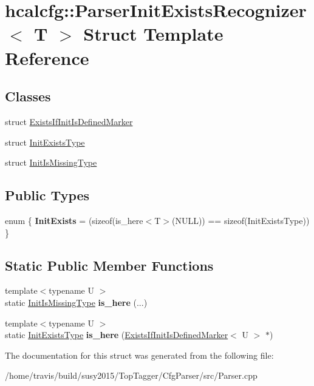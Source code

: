\hypertarget{structhcalcfg_1_1ParserInitExistsRecognizer}{\section{hcalcfg\-:\-:Parser\-Init\-Exists\-Recognizer$<$ T $>$ Struct Template Reference}
\label{structhcalcfg_1_1ParserInitExistsRecognizer}
}
\subsection*{Classes}
\begin{DoxyCompactItemize}
\item 
struct \hyperlink{structhcalcfg_1_1ParserInitExistsRecognizer_1_1ExistsIfInitIsDefinedMarker}{Exists\-If\-Init\-Is\-Defined\-Marker}
\item 
struct \hyperlink{structhcalcfg_1_1ParserInitExistsRecognizer_1_1InitExistsType}{Init\-Exists\-Type}
\item 
struct \hyperlink{structhcalcfg_1_1ParserInitExistsRecognizer_1_1InitIsMissingType}{Init\-Is\-Missing\-Type}
\end{DoxyCompactItemize}
\subsection*{Public Types}
\begin{DoxyCompactItemize}
\item 
enum \{ {\bfseries Init\-Exists} = (sizeof(is\-\_\-here$<$T$>$(N\-U\-L\-L)) == sizeof(Init\-Exists\-Type))
 \}
\end{DoxyCompactItemize}
\subsection*{Static Public Member Functions}
\begin{DoxyCompactItemize}
\item 
\hypertarget{structhcalcfg_1_1ParserInitExistsRecognizer_aadde7f9eaac716099eb3c14007f85c6b}{{\footnotesize template$<$typename U $>$ }\\static \hyperlink{structhcalcfg_1_1ParserInitExistsRecognizer_1_1InitIsMissingType}{Init\-Is\-Missing\-Type} {\bfseries is\-\_\-here} (...)}\label{structhcalcfg_1_1ParserInitExistsRecognizer_aadde7f9eaac716099eb3c14007f85c6b}

\item 
\hypertarget{structhcalcfg_1_1ParserInitExistsRecognizer_af638bb614f5dcd2848c4b7e85d3f8a4e}{{\footnotesize template$<$typename U $>$ }\\static \hyperlink{structhcalcfg_1_1ParserInitExistsRecognizer_1_1InitExistsType}{Init\-Exists\-Type} {\bfseries is\-\_\-here} (\hyperlink{structhcalcfg_1_1ParserInitExistsRecognizer_1_1ExistsIfInitIsDefinedMarker}{Exists\-If\-Init\-Is\-Defined\-Marker}$<$ U $>$ $\ast$)}\label{structhcalcfg_1_1ParserInitExistsRecognizer_af638bb614f5dcd2848c4b7e85d3f8a4e}

\end{DoxyCompactItemize}


The documentation for this struct was generated from the following file\-:\begin{DoxyCompactItemize}
\item 
/home/travis/build/susy2015/\-Top\-Tagger/\-Cfg\-Parser/src/Parser.\-cpp\end{DoxyCompactItemize}
